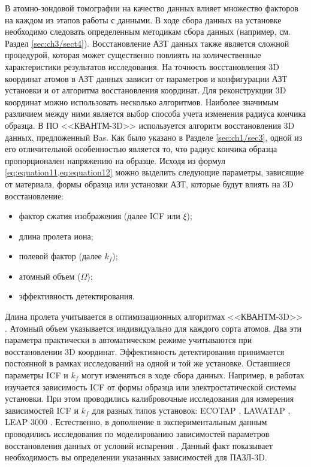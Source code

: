 В атомно-зондовой томографии на качество данных влияет множество факторов на каждом из этапов работы с данными. В ходе сбора данных на установке необходимо следовать определенным методикам сбора данных (например, см. Раздел \cref{sec:ch3/sect4}). Восстановление АЗТ данных также является сложной процедурой, которая может существенно повлиять на количественные характеристики результатов исследования. На точность восстановления 3D координат атомов в АЗТ данных зависит от параметров и конфигурации АЗТ установки и от алгоритма восстановления координат. Для реконструкции 3D координат можно использовать несколько алгоритмов. Наиболее значимым различием между ними является выбор способа учета изменения радиуса кончика образца. В ПО <<КВАНТМ-3D>> используется алгоритм восстановления 3D данных, предложенный Bas. Как было указано в Разделе \cref{sec:ch1/sec3}, одной из его отличительной особенностью является то, что радиус кончика образца пропорционален напряжению на образце. Исходя из формул \cref{eq:equation11,eq:equation12} можно выделить следующие параметры, зависящие от материала, формы образца или установки АЗТ, которые будут влиять на 3D восстановление:

\begin{itemize}[beginpenalty=10000] %
	\item фактор сжатия изображения (далее ICF или $\xi$);
	\item длина пролета иона;
	\item полевой фактор (далее $k_f$);
	\item атомный объем ($\Omega$);
	\item эффективность детектирования.
\end{itemize}

Длина пролета учитывается в оптимизационных алгоритмах <<КВАНТМ-3D>> \cite{Shutov18,Shutov19}. Атомный объем указывается индивидуально для каждого сорта атомов. Два эти параметра практически в автоматическом режиме учитываются при восстановлении 3D координат. Эффективность детектирования принимается постоянной в рамках исследований на одной и той же установке. Оставшиеся параметры ICF и $k_f$ могут изменяться в ходе сбора данных. Например, в работах \cite{Geiser09,Gipson08} изучается зависимость ICF от формы образца или электростатической системы установки. При этом проводились калибровочные исследования для измерения зависимостей ICF и $k_f$ для разных типов установок: ECOTAP \cite{Geiser09}, LAWATAP \cite{Renaud03}, LEAP 3000 \cite{Renaud06}. Естественно, в дополнение в экспериментальным данным проводились исследования по моделированию зависимостей параметров восстановления данных от условий испарения \cite{Vurpillot11,Miller14,Hatzoglou19}. Данный факт показывает необходимость вы определении указанных зависимостей для ПАЗЛ-3D.


